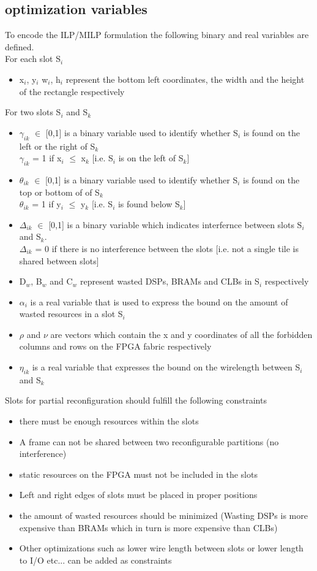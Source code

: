 \documentclass[11pt]{article}
\theoremstyle{definition}
\begin{document}
\subsection{optimization variables}
To encode the ILP/MILP formulation the following binary and real variables are defined. \\
For each slot S$_i$
\begin{itemize}
\item x$_i$, y$_i$ w$_i$, h$_i$ represent the bottom left coordinates, the width and the height of the rectangle respectively
\end{itemize}

For two slots S$_i$ and S$_k$ 
\begin{itemize}
\item $\gamma_{ik}$ $\in$ [0,1] is a binary variable used to identify whether S$_i$ is found on the left or the right of S$_k$\\
$\gamma_{ik}$ = 1 if x$_i$ $\leq$ x$_k$ [i.e. S$_i$ is on the left of S$_k$]
\item $\theta_{ik}$ $\in$ [0,1] is a binary variable used to identify whether S$_i$ is found on the top or bottom of of S$_k$\\
$\theta_{ik}$ = 1 if y$_i$ $\leq$ y$_k$ [i.e. S$_i$ is found below S$_k$]
\item $\Delta_{ik}$ $\in$ [0,1] is a binary variable which indicates interfernce between slots S$_i$ and S$_k$.\\
$\Delta_{ik}$ = 0 if there is no interference between the slots [i.e. not a single tile is shared between slots]
\item D$_{w}$, B$_w$ and C$_w$ represent wasted DSPs, BRAMs and CLBs in S$_i$ respectively
\item $\alpha_i$ is a real variable that is used to express the bound on the amount of wasted resources in a slot S$_i$
\item $\rho$ and $\nu$ are vectors which contain the x and y coordinates of all the forbidden columns and rows on the FPGA fabric respectively 
\item $\eta_{ik}$ is a real variable that expresses the bound on the wirelength between S$_i$ and S$_k$
\end{itemize}


Slots for partial reconfiguration should fulfill the following constraints
\begin{itemize}
\item there must be enough resources within the slots
\item A frame can not be shared between two reconfigurable partitions (no interference)
\item static resources on the FPGA must not be included in the slots 
\item Left and right edges of slots must be placed in proper positions
\item the amount of wasted resources should be minimized (Wasting DSPs is more expensive than BRAMs which in turn is more expensive than CLBs)
\item Other optimizations such as lower wire length between slots or lower length to I/O etc... can be added as constraints
\end{itemize}
\end{document}
